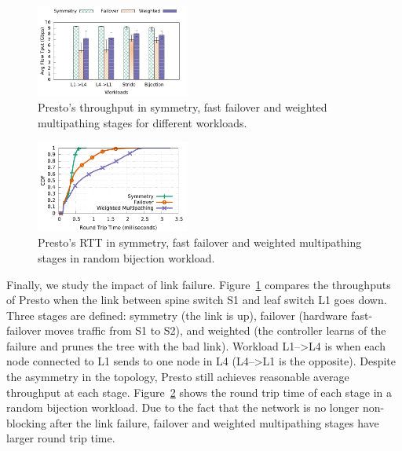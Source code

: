 
\begin{figure}[t]
        \centering
  \includegraphics[width=0.45\textwidth]{presto/figures/failure_handling/failover_compare_tput_witherrbar.pdf}
        \caption{Presto's throughput in symmetry, fast failover and weighted multipathing stages for different workloads.}
        \label{failover_compare_tput}
\end{figure}

\begin{figure}[t]
        \centering
  \includegraphics[width=0.45\textwidth]{presto/figures/failure_handling/failover_compare_sockperf_bijection_mice.pdf}
        \caption{Presto's RTT in symmetry, fast failover and weighted multipathing stages in  random bijection workload.}
        \label{failover_compare_sockperf_bijection}
\end{figure}

Finally, we study the impact of link failure.
Figure~\ref{failover_compare_tput} compares the throughputs of
Presto when %
the link between spine switch S1 and leaf switch L1 goes down.
Three stages are defined: symmetry (the link is up), failover (hardware fast-failover moves traffic from S1 to S2), and weighted (the controller
learns of the failure and prunes the tree with the bad link).
Workload L1-->L4 is when each node connected to L1 sends to one node in L4 (L4-->L1 is the opposite).
Despite the asymmetry in the topology, Presto still achieves reasonable average throughput at 
each stage.
Figure~\ref{failover_compare_sockperf_bijection} shows the round trip time of
each stage in a random bijection workload. 
Due to the fact that the network is no longer non-blocking after the link failure,
failover and weighted multipathing stages have larger round trip time.



